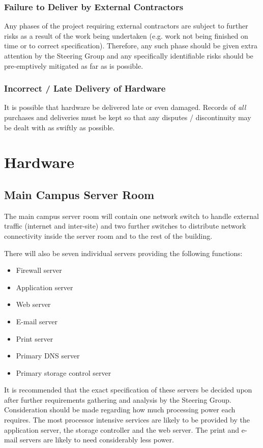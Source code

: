 \documentclass[a4paper, twoside]{article}
\begin{document}
\subsubsection{Failure to Deliver by External Contractors}
Any phases of the project requiring external contractors are subject to further
risks as a result of the work being undertaken (e.g. work not being finished on
time or to correct specification). Therefore, any such phase should be given
extra attention by the Steering Group and any specifically identifiable risks
should be pre-emptively mitigated as far as is possible.

\subsubsection{Incorrect / Late Delivery of Hardware}
It is possible that hardware be delivered late or even damaged. Records of
\emph{all} purchases and deliveries must be kept so that any
disputes / discontinuity may be dealt with as swiftly as possible.

\section{Hardware}
\subsection{Main Campus Server Room}
The main campus server room will contain one network switch to handle external
traffic (internet and inter-site) and two further switches to distribute network
connectivity inside the server room and to the rest of the building.

\clearpage
There will also be seven individual servers providing the following functions:
\begin{itemize}
\item{Firewall server}
\item{Application server}
\item{Web server}
\item{E-mail server}
\item{Print server}
\item{Primary DNS server}
\item{Primary storage control server}
\end{itemize}
It is recommended that the exact specification of these servers be decided upon
after further requirements gathering and analysis by the Steering Group.
Consideration should be made regarding how much processing power each requires.
The most processor intensive services are likely to be provided by the
application server, the storage controller and the web server. The print and
e-mail servers are likely to need considerably less power.
\end{document}
